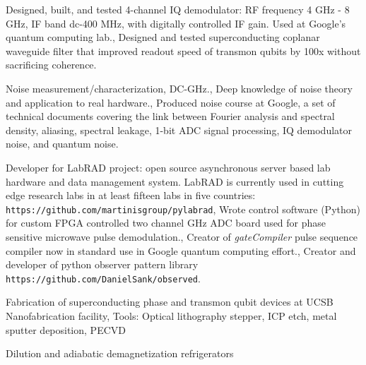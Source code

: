 {
  {Designed, built, and tested 4-channel IQ demodulator: RF frequency 4 GHz - 8 GHz, IF band dc-400 MHz, with digitally controlled IF gain. Used at Google's quantum computing lab.},
  {Designed and tested superconducting coplanar waveguide filter that improved readout speed of transmon qubits by 100x without sacrificing coherence.}
}

{
  {Noise measurement/characterization, DC-GHz.},
  {Deep knowledge of noise theory and application to real hardware.},
  {Produced noise course at Google, a set of technical documents covering the link between Fourier analysis and spectral density, aliasing, spectral leakage, 1-bit ADC signal processing, IQ demodulator noise, and quantum noise.}
}


{
  {Developer for LabRAD project: open source asynchronous server based lab hardware and data management system. LabRAD is currently used in cutting edge research labs in at least fifteen labs in five countries: \texttt{https://github.com/martinisgroup/pylabrad}},
  {Wrote control software (Python) for custom FPGA controlled two channel GHz ADC board used for phase sensitive microwave pulse demodulation.},
  {Creator of \emph{gateCompiler} pulse sequence compiler now in standard use in Google quantum computing effort.},
  {Creator and developer of python observer pattern library \\ \quad \texttt{https://github.com/DanielSank/observed}.}
}

\newpage

{
  {Fabrication of superconducting phase and transmon qubit devices at UCSB Nanofabrication facility},
  {Tools: Optical lithography stepper, ICP etch, metal sputter deposition, PECVD}
}

{
  {Dilution and adiabatic demagnetization refrigerators}
}
